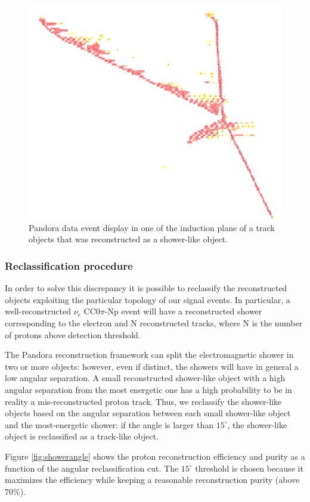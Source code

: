 \begin{figure}[htbp]
\centering
  \includegraphics[width=0.45\linewidth]{figures/pandora.png}
  \caption{Pandora data event display in one of the induction plane of a track objects that was reconstructed as a shower-like object.}
  \label{fig:evdpandora}
\end{figure}

\subsubsection{Reclassification procedure}
In order to solve this discrepancy it is possible to reclassify the reconstructed objects exploiting the particular topology of our signal events. In particular, a well-reconstructed $\nu_{e}$ CC0$\pi$-Np event will have a reconstructed shower corresponding to the electron and N reconstructed tracks, where N is the number of protons above detection threshold. 

The Pandora reconstruction framework can split the electromagnetic shower in two or more objects: however, even if distinct, the showers will have in general a low angular separation. A small reconstructed shower-like object with a high angular separation from the most energetic one has a high probability to be in reality a mis-reconstructed proton track. Thus, we reclassify the shower-like objects based on the angular separation between each small shower-like object and the most-energetic shower: if the angle is larger than $15^{\circ}$, the shower-like object is reclassified as a track-like object.

Figure \ref{fig:showerangle} shows the proton reconstruction efficiency and purity as a function of the angular reclassification cut. The $15^{\circ}$ threshold is chosen because it maximizes the efficiency while keeping a reasonable reconstruction purity (above 70\%).

